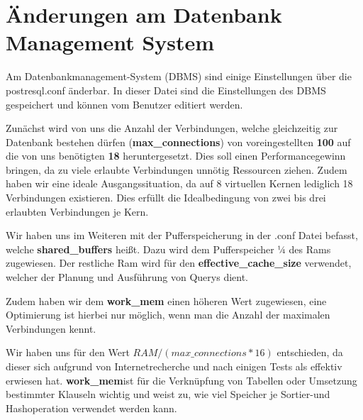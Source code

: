 \section{Änderungen am Datenbank Management System}

Am Datenbankmanagement-System (DBMS) sind einige Einstellungen über die
postresql.conf änderbar. In dieser Datei sind die Einstellungen des DBMS
gespeichert und können vom Benutzer editiert werden.

Zunächst wird von uns die Anzahl der Verbindungen, welche gleichzeitig zur
Datenbank bestehen dürfen (\textbf{max\_connections}) von voreingestellten
\textbf{100} auf die von uns benötigten \textbf{18} heruntergesetzt. 
Dies soll einen Performancegewinn bringen, da zu viele erlaubte Verbindungen
unnötig Ressourcen ziehen. Zudem haben wir eine ideale Ausgangssituation, da auf
8 virtuellen Kernen lediglich 18 Verbindungen existieren. Dies erfüllt die
Idealbedingung von zwei bis drei erlaubten Verbindungen je Kern.

Wir haben uns im Weiteren mit der Pufferspeicherung in der .conf Datei befasst,
welche \textbf{shared\_buffers} heißt. Dazu wird dem Pufferspeicher ¼ des Rams
zugewiesen. Der restliche Ram wird für den \textbf{effective\_cache\_size}
verwendet, welcher der Planung und Ausführung von Querys dient.

Zudem haben wir dem \textbf{work\_mem} einen höheren Wert zugewiesen, eine
Optimierung ist hierbei nur möglich, wenn man die Anzahl der maximalen Verbindungen kennt.


Wir haben uns für den Wert $RAM/(max\_connections * 16)$ entschieden, da
dieser sich aufgrund von Internetrecherche und nach einigen Tests als effektiv
erwiesen hat. \textbf{work\_mem}ist für die Verknüpfung von Tabellen oder
Umsetzung bestimmter Klauseln wichtig und weist zu, wie viel Speicher je Sortier-und
Hashoperation verwendet werden kann.

\clearpage